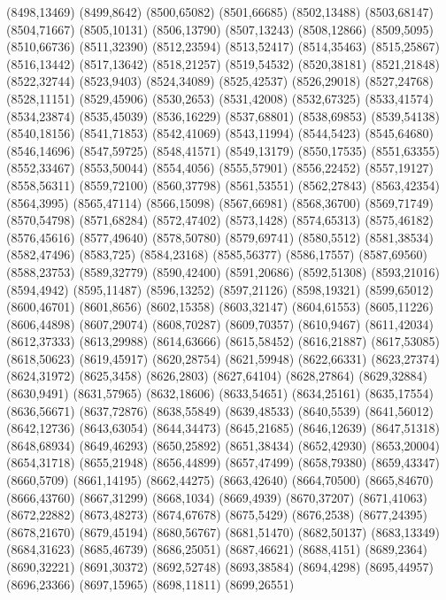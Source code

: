 (8498,13469)
(8499,8642)
(8500,65082)
(8501,66685)
(8502,13488)
(8503,68147)
(8504,71667)
(8505,10131)
(8506,13790)
(8507,13243)
(8508,12866)
(8509,5095)
(8510,66736)
(8511,32390)
(8512,23594)
(8513,52417)
(8514,35463)
(8515,25867)
(8516,13442)
(8517,13642)
(8518,21257)
(8519,54532)
(8520,38181)
(8521,21848)
(8522,32744)
(8523,9403)
(8524,34089)
(8525,42537)
(8526,29018)
(8527,24768)
(8528,11151)
(8529,45906)
(8530,2653)
(8531,42008)
(8532,67325)
(8533,41574)
(8534,23874)
(8535,45039)
(8536,16229)
(8537,68801)
(8538,69853)
(8539,54138)
(8540,18156)
(8541,71853)
(8542,41069)
(8543,11994)
(8544,5423)
(8545,64680)
(8546,14696)
(8547,59725)
(8548,41571)
(8549,13179)
(8550,17535)
(8551,63355)
(8552,33467)
(8553,50044)
(8554,4056)
(8555,57901)
(8556,22452)
(8557,19127)
(8558,56311)
(8559,72100)
(8560,37798)
(8561,53551)
(8562,27843)
(8563,42354)
(8564,3995)
(8565,47114)
(8566,15098)
(8567,66981)
(8568,36700)
(8569,71749)
(8570,54798)
(8571,68284)
(8572,47402)
(8573,1428)
(8574,65313)
(8575,46182)
(8576,45616)
(8577,49640)
(8578,50780)
(8579,69741)
(8580,5512)
(8581,38534)
(8582,47496)
(8583,725)
(8584,23168)
(8585,56377)
(8586,17557)
(8587,69560)
(8588,23753)
(8589,32779)
(8590,42400)
(8591,20686)
(8592,51308)
(8593,21016)
(8594,4942)
(8595,11487)
(8596,13252)
(8597,21126)
(8598,19321)
(8599,65012)
(8600,46701)
(8601,8656)
(8602,15358)
(8603,32147)
(8604,61553)
(8605,11226)
(8606,44898)
(8607,29074)
(8608,70287)
(8609,70357)
(8610,9467)
(8611,42034)
(8612,37333)
(8613,29988)
(8614,63666)
(8615,58452)
(8616,21887)
(8617,53085)
(8618,50623)
(8619,45917)
(8620,28754)
(8621,59948)
(8622,66331)
(8623,27374)
(8624,31972)
(8625,3458)
(8626,2803)
(8627,64104)
(8628,27864)
(8629,32884)
(8630,9491)
(8631,57965)
(8632,18606)
(8633,54651)
(8634,25161)
(8635,17554)
(8636,56671)
(8637,72876)
(8638,55849)
(8639,48533)
(8640,5539)
(8641,56012)
(8642,12736)
(8643,63054)
(8644,34473)
(8645,21685)
(8646,12639)
(8647,51318)
(8648,68934)
(8649,46293)
(8650,25892)
(8651,38434)
(8652,42930)
(8653,20004)
(8654,31718)
(8655,21948)
(8656,44899)
(8657,47499)
(8658,79380)
(8659,43347)
(8660,5709)
(8661,14195)
(8662,44275)
(8663,42640)
(8664,70500)
(8665,84670)
(8666,43760)
(8667,31299)
(8668,1034)
(8669,4939)
(8670,37207)
(8671,41063)
(8672,22882)
(8673,48273)
(8674,67678)
(8675,5429)
(8676,2538)
(8677,24395)
(8678,21670)
(8679,45194)
(8680,56767)
(8681,51470)
(8682,50137)
(8683,13349)
(8684,31623)
(8685,46739)
(8686,25051)
(8687,46621)
(8688,4151)
(8689,2364)
(8690,32221)
(8691,30372)
(8692,52748)
(8693,38584)
(8694,4298)
(8695,44957)
(8696,23366)
(8697,15965)
(8698,11811)
(8699,26551)

